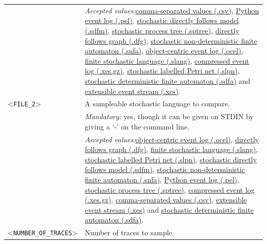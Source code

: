 {\begin{tabularx}{\linewidth}{lX}
&\textit{Accepted values:}\quad \hyperref[filehandler:comma-separated values]{comma-separated values (.csv)}, \hyperref[filehandler:Python event log]{Python event log (.pel)}, \hyperref[filehandler:stochastic directly follows model]{stochastic directly follows model (.sdfm)}, \hyperref[filehandler:stochastic process tree]{stochastic process tree (.sptree)}, \hyperref[filehandler:directly follows graph]{directly follows graph (.dfg)}, \hyperref[filehandler:stochastic non-deterministic finite automaton]{stochastic non-deterministic finite automaton (.snfa)}, \hyperref[filehandler:object-centric event log]{object-centric event log (.ocel)}, \hyperref[filehandler:finite stochastic language]{finite stochastic language (.slang)}, \hyperref[filehandler:compressed event log]{compressed event log (.xes.gz)}, \hyperref[filehandler:stochastic labelled Petri net]{stochastic labelled Petri net (.slpn)}, \hyperref[filehandler:stochastic deterministic finite automaton]{stochastic deterministic finite automaton (.sdfa)} and \hyperref[filehandler:extensible event stream]{extensible event stream (.xes)}.\\
<\texttt{FILE\_2}>&A sampleable stochastic language to compare.\\
&\textit{Mandatory:} \quad yes, though it can be given on STDIN by giving a `-' on the command line.\\
&\textit{Accepted values:}\quad \hyperref[filehandler:object-centric event log]{object-centric event log (.ocel)}, \hyperref[filehandler:directly follows graph]{directly follows graph (.dfg)}, \hyperref[filehandler:finite stochastic language]{finite stochastic language (.slang)}, \hyperref[filehandler:stochastic labelled Petri net]{stochastic labelled Petri net (.slpn)}, \hyperref[filehandler:stochastic directly follows model]{stochastic directly follows model (.sdfm)}, \hyperref[filehandler:stochastic non-deterministic finite automaton]{stochastic non-deterministic finite automaton (.snfa)}, \hyperref[filehandler:Python event log]{Python event log (.pel)}, \hyperref[filehandler:stochastic process tree]{stochastic process tree (.sptree)}, \hyperref[filehandler:compressed event log]{compressed event log (.xes.gz)}, \hyperref[filehandler:comma-separated values]{comma-separated values (.csv)}, \hyperref[filehandler:extensible event stream]{extensible event stream (.xes)} and \hyperref[filehandler:stochastic deterministic finite automaton]{stochastic deterministic finite automaton (.sdfa)}.\\
<\texttt{NUMBER\_OF\_TRACES}>&Number of traces to sample.\\

\end{tabularx}}
